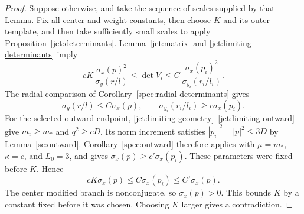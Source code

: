 \begin{proof}
Suppose otherwise, and take the sequence of scales supplied
by that Lemma. Fix all center and weight constants, then
choose $K$ and its outer template, and then take sufficiently
small scales to apply Proposition~\ref{jet:determinants}.
Lemma~\ref{jet:matrix} and
\eqref{jet:limiting-determinants} imply
\[
 cK\,\frac{\sigma_x(p)^2}{\sigma_y(r/l)}
 \le \det V_i
 \le C\,\frac{\sigma_x(p_i)^2}{\sigma_{y_i}(r_i/l_i)}.
\]
The radial comparison of Corollary~\ref{spec:radial-determinants} gives
\[
 \sigma_y(r/l)\le C\sigma_x(p),\qquad
 \sigma_{y_i}(r_i/l_i)\ge c\sigma_x(p_i).
\]
For the selected outward endpoint,
\eqref{jet:limiting-geometry}--\eqref{jet:limiting-outward} give
$m_i\ge m_*$ and $q^2\ge cD$. Its norm increment satisfies
$|p_i|^2-|p|^2\le3D$ by Lemma~\ref{sc:outward}.
Corollary~\ref{spec:outward} therefore applies with
$\mu=m_*$, $\kappa=c$, and $L_0=3$, and gives
$\sigma_x(p)\ge c'\sigma_x(p_i)$. These parameters were fixed
before $K$. Hence
\[
 cK\sigma_x(p)\le C\sigma_x(p_i)\le C'\sigma_x(p).
\]
The center modified branch is nonconjugate, so
$\sigma_x(p)>0$. This bounds $K$ by a constant fixed before
it was chosen. Choosing $K$ larger gives a contradiction.
\end{proof}
